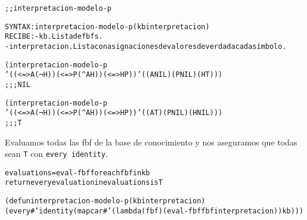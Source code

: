 \begin{aibox}{\function}
\begin{alltt}
;; interpretacion-modelo-p

SYNTAX: interpretacion-modelo-p (kb interpretacion) 
RECIBE: - kb. Lista de fbfs.
		- interpretacion. Lista con asignaciones de valores de verdad a cada símbolo.

\end{alltt}
\end{aibox}

\begin{aibox}{\examples}
\begin{alltt}
(interpretacion-modelo-p 
 '((<=> A (¬ H)) (<=> P (^ A  H)) (<=> H P)) '((A NIL) (P NIL) (H T)))
 ;;; NIL

(interpretacion-modelo-p
 '((<=> A (¬ H)) (<=> P (^ A  H)) (<=> H P)) '((A T) (P NIL) (H NIL)))
;;; T
\end{alltt}
\end{aibox}

\begin{aibox}{\comments}
Evaluamos todas las fbf de la base de conocimiento y nos aseguramos que todas sean \texttt{T} con \texttt{every identity}.
\end{aibox}

\begin{aibox}{\pseudocode}
\begin{alltt}
evaluations = eval-fbf for each fbf in kb
return every evaluation in evaluations is T

\end{alltt}
\end{aibox}
\begin{aibox}{\code}

\begin{alltt}

(defun interpretacion-modelo-p (kb interpretacion) 
  (every #'identity (mapcar #'(lambda (fbf) (eval-fbf fbf interpretacion)) kb)))

\end{alltt}
\end{aibox}
